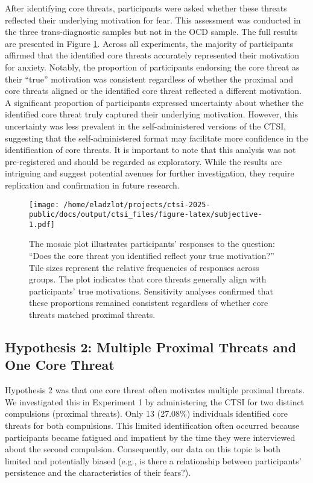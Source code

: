 \documentclass[
  man,floatsintext]{apa7}
\begin{document}
After identifying core threats, participants were asked whether these threats reflected their underlying motivation for fear.
This assessment was conducted in the three trans-diagnostic samples but not in the OCD sample.
The full results are presented in Figure \ref{fig:subjective}.
Across all experiments, the majority of participants affirmed that the identified core threats accurately represented their motivation for anxiety.
Notably, the proportion of participants endorsing the core threat as their ``true'' motivation was consistent regardless of whether the proximal and core threats aligned or the identified core threat reflected a different motivation.
A significant proportion of participants expressed uncertainty about whether the identified core threat truly captured their underlying motivation.
However, this uncertainty was less prevalent in the self-administered versions of the CTSI, suggesting that the self-administered format may facilitate more confidence in the identification of core threats.
It is important to note that this analysis was not pre-registered and should be regarded as exploratory.
While the results are intriguing and suggest potential avenues for further investigation, they require replication and confirmation in future research.



\begin{figure}
\centering
\texttt{[image: /home/eladzlot/projects/ctsi-2025-public/docs/output/ctsi\_files/figure-latex/subjective-1.pdf]}
\caption{\label{fig:subjective}The mosaic plot illustrates participants' responses to the question: ``Does the core threat you identified reflect your true motivation?'' Tile sizes represent the relative frequencies of responses across groups. The plot indicates that core threats generally align with participants' true motivations. Sensitivity analyses confirmed that these proportions remained consistent regardless of whether core threats matched proximal threats.}
\end{figure}

\subsection{Hypothesis 2: Multiple Proximal Threats and One Core Threat}\label{hypothesis-2-multiple-proximal-threats-and-one-core-threat}

Hypothesis 2 was that one core threat often motivates multiple proximal threats.
We investigated this in Experiment 1 by administering the CTSI for two distinct compulsions (proximal threats).
Only 13 (27.08\%) individuals identified core threats for both compulsions.
This limited identification often occurred because participants became fatigued and impatient by the time they were interviewed about the second compulsion.
Consequently, our data on this topic is both limited and potentially biased (e.g., is there a relationship between participants' persistence and the characteristics of their fears?).
\end{document}
